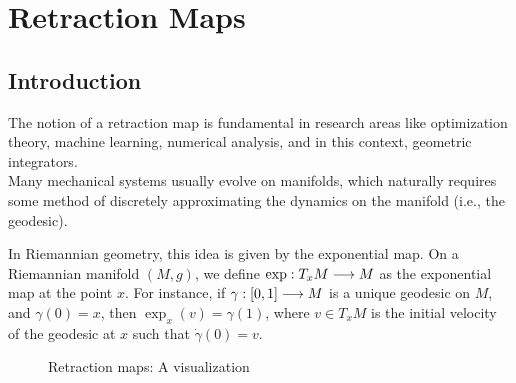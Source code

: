 % 
\chapter{Retraction Maps} %
\label{chap:retr} %


%
\section{Introduction} 
\label{sec:retr-intro} %

The notion of a retraction map is fundamental in research areas like optimization theory, machine learning, numerical analysis, and in this context, geometric integrators. \\ Many mechanical systems usually evolve on manifolds, which naturally requires some method of discretely approximating the dynamics on the manifold (i.e., the geodesic). 

In Riemannian geometry, this idea is given by the exponential map. On a Riemannian manifold $(M, g)$, we define $\exp: T_x M \longrightarrow M$ as the exponential map at the point $x$. For instance, if  $\gamma: [0, 1] \longrightarrow M$ is a unique geodesic on $M$, and $\gamma(0) = x$, then $\exp_x(v) = \gamma(1)$, where $v \in T_x M$ is the initial velocity of the geodesic at $x$ such that $\dot{\gamma}(0) = v$.

    \begin{figure}[h]
        \centering
        \caption{Retraction maps: A visualization}
            \label{fig:retraction}
        \end{figure}

